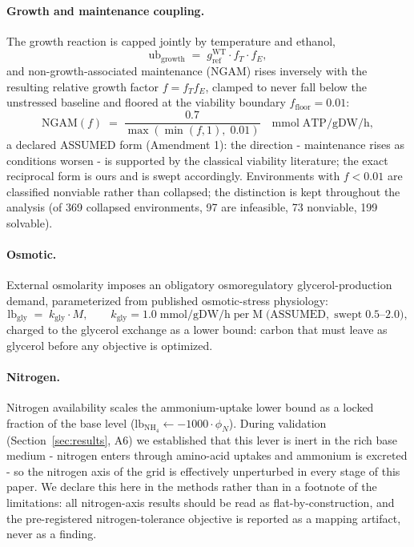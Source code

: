 \documentclass[12pt]{article}
\begin{document}
\paragraph{Growth and maintenance coupling.} The growth reaction is
capped jointly by temperature and ethanol,
\begin{equation}
\mathrm{ub}_{\mathrm{growth}} \;=\; g^{\mathrm{WT}}_{\mathrm{ref}} \cdot f_T \cdot f_E ,
\end{equation}
and non-growth-associated maintenance (NGAM) rises inversely with the
resulting relative growth factor $f=f_T f_E$, clamped to never fall below
the unstressed baseline and floored at the viability boundary
$f_{\mathrm{floor}}=0.01$:
\begin{equation}
\mathrm{NGAM}(f) \;=\; \frac{0.7}{\max(\min(f,1),\;0.01)}
\quad \mathrm{mmol\;ATP/gDW/h,}
\end{equation}
a declared ASSUMED form (Amendment 1): the direction - maintenance rises
as conditions worsen - is supported by the classical viability
literature; the exact reciprocal form is ours and is swept accordingly.
Environments with $f<0.01$ are classified nonviable rather than
collapsed; the distinction is kept throughout the analysis (of 369
collapsed environments, 97 are infeasible, 73 nonviable, 199 solvable).

\paragraph{Osmotic.} External osmolarity imposes an obligatory
osmoregulatory glycerol-production demand, parameterized from published
osmotic-stress physiology:
\begin{equation}
\mathrm{lb}_{\mathrm{gly}} \;=\; k_{\mathrm{gly}} \cdot M,
\qquad k_{\mathrm{gly}} = 1.0\;\mathrm{mmol/gDW/h\;per\;M}
\;\mathrm{(ASSUMED,\;swept}\;0.5\text{--}2.0\mathrm{)},
\end{equation}
charged to the glycerol exchange as a lower bound: carbon that must leave
as glycerol before any objective is optimized.

\paragraph{Nitrogen.} Nitrogen availability scales the ammonium-uptake
lower bound as a locked fraction of the base level
($\mathrm{lb}_{\mathrm{NH_4}} \leftarrow -1000 \cdot \phi_N$). During
validation (Section~\ref{sec:results}, A6) we established that this lever
is inert in the rich base medium - nitrogen enters through amino-acid
uptakes and ammonium is excreted - so the nitrogen axis of the grid is
effectively unperturbed in every stage of this paper. We declare this
here in the methods rather than in a footnote of the limitations: all
nitrogen-axis results should be read as flat-by-construction, and the
pre-registered nitrogen-tolerance objective is reported as a mapping
artifact, never as a finding.
\end{document}
